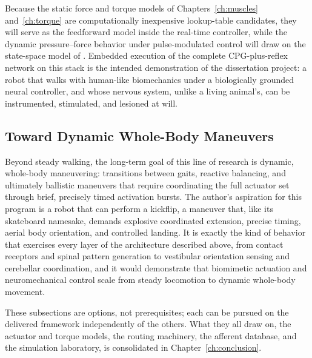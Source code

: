 Because the static force and torque models of Chapters~\ref{ch:muscles} and~\ref{ch:torque} are computationally inexpensive lookup-table candidates, they will serve as the feedforward model inside the real-time controller, while the dynamic pressure--force behavior under pulse-modulated control will draw on the state-space model of \citet{elzein_pressure_2025}. Embedded execution of the complete CPG-plus-reflex network on this stack is the intended demonstration of the dissertation project: a robot that walks with human-like biomechanics under a biologically grounded neural controller, and whose nervous system, unlike a living animal's, can be instrumented, stimulated, and lesioned at will.

\subsection{Toward Dynamic Whole-Body Maneuvers}\label{sec:fw_kickflip}

Beyond steady walking, the long-term goal of this line of research is dynamic, whole-body maneuvering: transitions between gaits, reactive balancing, and ultimately ballistic maneuvers that require coordinating the full actuator set through brief, precisely timed activation bursts. The author's aspiration for this program is a robot that can perform a kickflip, a maneuver that, like its skateboard namesake, demands explosive coordinated extension, precise timing, aerial body orientation, and controlled landing. It is exactly the kind of behavior that exercises every layer of the architecture described above, from contact receptors and spinal pattern generation to vestibular orientation sensing and cerebellar coordination, and it would demonstrate that biomimetic actuation and neuromechanical control scale from steady locomotion to dynamic whole-body movement.

These subsections are options, not prerequisites; each can be pursued on the delivered framework independently of the others. What they all draw on, the actuator and torque models, the routing machinery, the afferent database, and the simulation laboratory, is consolidated in Chapter~\ref{ch:conclusion}.

